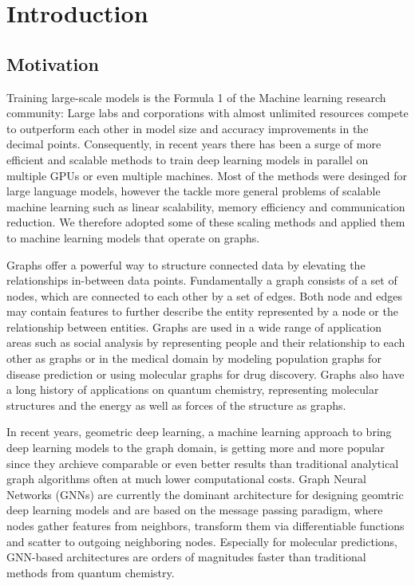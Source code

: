 \section{Introduction}

\subsection{Motivation}

Training large-scale models is the Formula 1 of the Machine learning research community: Large labs and corporations with 
almost unlimited resources compete to outperform each other in model size and accuracy improvements in the decimal points. 
Consequently, in recent years there has been a surge of more efficient and scalable methods to train deep learning models 
in parallel on multiple GPUs or even multiple machines. Most of the methods were desinged for large language models, however 
the tackle more general problems of scalable machine learning such as linear scalability, memory efficiency and 
communication reduction. We therefore adopted some of these scaling methods and applied them to machine learning models 
that operate on graphs. 

Graphs offer a powerful way to structure connected data by elevating the relationships in-between data points. 
Fundamentally a graph consists of a set of nodes, which are connected to each other by a set of edges. Both node 
and edges may contain features to further describe the entity represented by a node or the relationship between entities.
Graphs are used in a wide range of application areas such as social analysis by representing people and their relationship 
to each other as graphs or in the medical domain by modeling population graphs for disease prediction or using molecular graphs 
for drug discovery. Graphs also have a long history of applications on quantum chemistry, representing molecular 
structures and the energy as well as forces of the structure as graphs. 

In recent years, geometric deep learning, a machine learning approach to bring deep learning models 
to the graph domain, is getting more and more popular since they archieve comparable or even better 
results than traditional analytical graph algorithms often at much lower computational costs. Graph Neural 
Networks (GNNs) are currently the dominant architecture for designing geomtric deep learning models and 
are based on the message passing paradigm, where nodes gather features from neighbors, transform them via 
differentiable functions and scatter to outgoing neighboring nodes. Especially for molecular predictions, 
GNN-based architectures are orders of magnitudes faster than traditional methods from quantum chemistry. 

